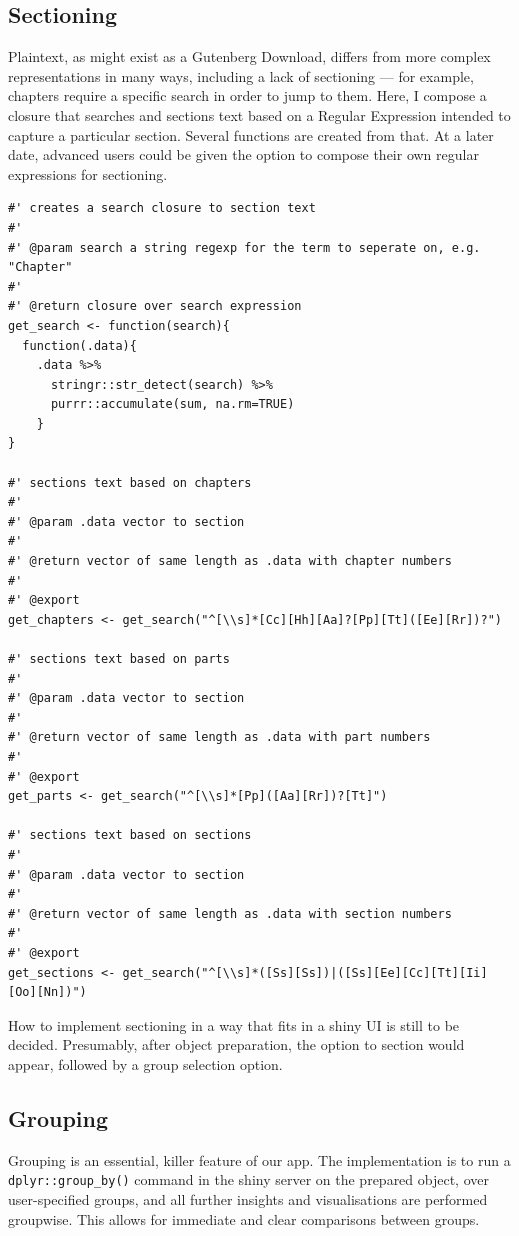 \documentclass[11pt, a4paper, oneside]{report}
\begin{document}
\subsection{Sectioning}
\label{sec:orgb5ccf72}
Plaintext, as might exist as a Gutenberg Download, differs from more
complex representations in many ways, including a lack of sectioning
--- for example, chapters require a specific search in order to jump
to them. Here, I compose a closure that searches and sections text
based on a Regular Expression intended to capture a particular
section. Several functions are created from that. At a later date,
advanced users could be given the option to compose their own regular
expressions for sectioning.
\begin{verbatim}
#' creates a search closure to section text
#'
#' @param search a string regexp for the term to seperate on, e.g. "Chapter"
#'
#' @return closure over search expression 
get_search <- function(search){
  function(.data){
    .data %>%
      stringr::str_detect(search) %>%
      purrr::accumulate(sum, na.rm=TRUE)
    }
}

#' sections text based on chapters
#'
#' @param .data vector to section
#'
#' @return vector of same length as .data with chapter numbers
#'
#' @export
get_chapters <- get_search("^[\\s]*[Cc][Hh][Aa]?[Pp][Tt]([Ee][Rr])?")

#' sections text based on parts
#'
#' @param .data vector to section
#'
#' @return vector of same length as .data with part numbers
#'
#' @export
get_parts <- get_search("^[\\s]*[Pp]([Aa][Rr])?[Tt]")

#' sections text based on sections
#'
#' @param .data vector to section
#'
#' @return vector of same length as .data with section numbers
#'
#' @export
get_sections <- get_search("^[\\s]*([Ss][Ss])|([Ss][Ee][Cc][Tt][Ii][Oo][Nn])")
\end{verbatim}

How to implement sectioning in a way that fits in a shiny UI is still
to be decided. Presumably, after object preparation, the option to
section would appear, followed by a group selection option.

\subsection{Grouping}
\label{sec:orga051982}
Grouping is an essential, killer feature of our app. The
implementation is to run a \texttt{dplyr::group_by()} command
in the shiny server on the prepared object, over user-specified
groups, and all further insights and visualisations are performed
groupwise. This allows for immediate and clear comparisons between
groups.
\end{document}
